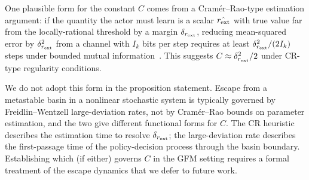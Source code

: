 \begin{remark}
\label{rem:cr_heuristic}
One plausible form for the constant $C$ comes from a
Cram\'er--Rao-type estimation argument: if the quantity the actor must
learn is a scalar $\hat{r_{\mathrm{ext}}}$ with true value far from the
locally-rational threshold by a margin $\delta_{r_{\mathrm{ext}}}$, reducing
mean-squared error by $\delta_{r_{\mathrm{ext}}}^2$ from a channel with $I_k$
bits per step requires at least $\delta_{r_{\mathrm{ext}}}^2 / (2 I_k)$ steps
under bounded mutual information~\citep{cover2006elements}.  This
suggests $C \approx \delta_{r_{\mathrm{ext}}}^2 / 2$ under CR-type regularity
conditions.

We do not adopt this form in the proposition statement.  Escape from
a metastable basin in a nonlinear stochastic system is typically
governed by Freidlin--Wentzell large-deviation rates, not by
Cram\'er--Rao bounds on parameter estimation, and the two give
different functional forms for $C$.  The CR heuristic describes the
estimation time to resolve $\delta_{r_{\mathrm{ext}}}$; the large-deviation rate
describes the first-passage time of the policy-decision process
through the basin boundary.  Establishing which (if either) governs
$C$ in the GFM setting requires a formal treatment of the escape
dynamics that we defer to future work.
\end{remark}

